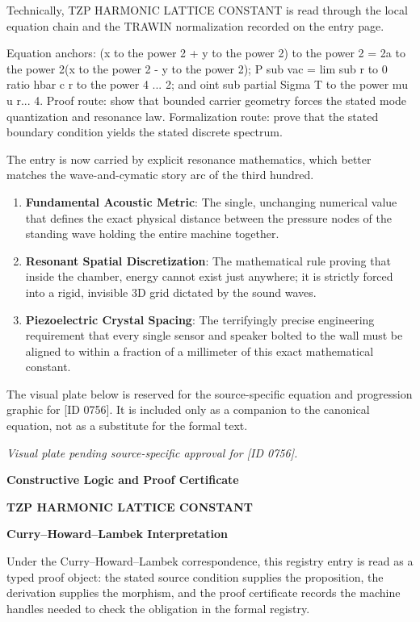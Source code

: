Technically, TZP HARMONIC LATTICE CONSTANT is read through the local equation chain and the TRAWIN normalization recorded on the entry page.

Equation anchors: (x to the power 2 + y to the power 2) to the power 2 = 2a to the power 2(x to the power 2 - y to the power 2); P sub vac = lim sub r to 0 ratio hbar c r to the power 4 ... 2; and oint sub partial Sigma T to the power mu u r... 4. Proof route: show that bounded carrier geometry forces the stated mode quantization and resonance law. Formalization route: prove that the stated boundary condition yields the stated discrete spectrum.

The entry is now carried by explicit resonance mathematics, which better matches the wave-and-cymatic story arc of the third hundred.
\endgroup

\begin{enumerate}[leftmargin=1.6em,itemsep=6pt,topsep=4pt]
\item \textbf{Fundamental Acoustic Metric}: The single, unchanging numerical value that defines the exact physical distance between the pressure nodes of the standing wave holding the entire machine together.
\item \textbf{Resonant Spatial Discretization}: The mathematical rule proving that inside the chamber, energy cannot exist just anywhere; it is strictly forced into a rigid, invisible 3D grid dictated by the sound waves.
\item \textbf{Piezoelectric Crystal Spacing}: The terrifyingly precise engineering requirement that every single sensor and speaker bolted to the wall must be aligned to within a fraction of a millimeter of this exact mathematical constant.
\end{enumerate}

\begingroup\footnotesize\sloppy
The visual plate below is reserved for the source-specific equation and progression graphic for [ID 0756]. It is included only as a companion to the canonical equation, not as a substitute for the formal text.
\par\endgroup
\begingroup\footnotesize\itshape
Visual plate pending source-specific approval for [ID 0756].
\par\endgroup

\clearpage
\begingroup\tzpsupportsetup
\noindent\textbf{\fontsize{10.8pt}{12.8pt}\selectfont [ID 0756] Constructive Logic and Proof Certificate}\par
\noindent\textbf{\fontsize{10pt}{12pt}\selectfont TZP HARMONIC LATTICE CONSTANT}\par
\vspace{0.45em}
\begingroup
\footnotesize
\setlength{\parskip}{0.22em}
\setlength{\parindent}{0pt}
\noindent\textbf{Curry--Howard--Lambek Interpretation}\par
Under the Curry--Howard--Lambek correspondence, this registry entry is read as a typed proof
object: the stated source condition supplies the proposition, the derivation supplies the
morphism, and the proof certificate records the machine handles needed to check the obligation
in the formal registry.

